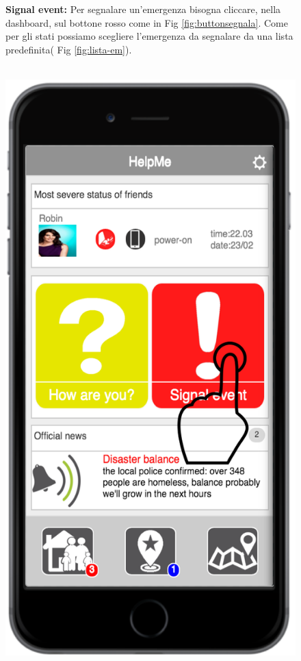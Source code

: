 \newpage


 \begin{figure}
  \textbf{Signal event:} Per segnalare un'emergenza bisogna cliccare, nella dashboard, sul bottone rosso come in Fig \ref{fig:buttonsegnala}. Come per gli stati possiamo scegliere l'emergenza da segnalare da una lista predefinita( Fig \ref{fig:lista-em}).
 \\ \\
 \begin{minipage}[b]{6cm}
   \centering
 \includegraphics[scale=0.6]{interfaccia/tapbuttonsegnala.png}

\end{minipage}
\end{figure}
